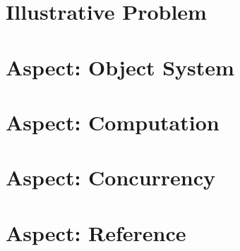 
\section{Illustrative Problem}\label{sec:illustrative-problem}

\section{Aspect: Object System}\label{sec:object-system}

\section{Aspect: Computation}\label{sec:computation}

\section{Aspect: Concurrency}\label{sec:concurrency}

\section{Aspect: Reference}\label{sec:reference}

